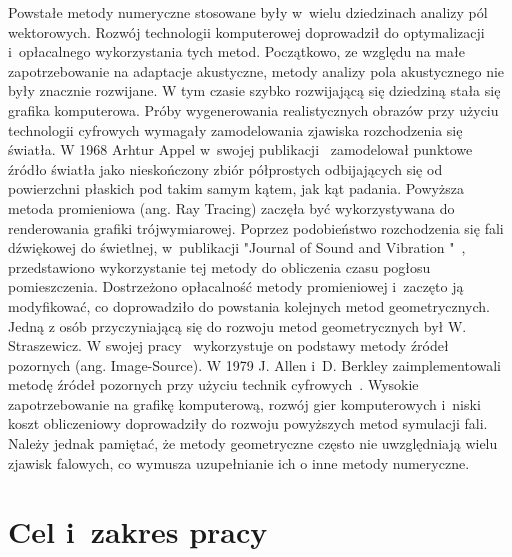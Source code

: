 Powstałe metody numeryczne stosowane były w~wielu dziedzinach analizy pól wektorowych. Rozwój technologii komputerowej doprowadził do optymalizacji i~opłacalnego wykorzystania tych metod. Początkowo, ze względu na małe zapotrzebowanie na adaptacje akustyczne, metody analizy pola akustycznego nie były znacznie rozwijane. W tym czasie szybko rozwijającą się dziedziną stała się grafika komputerowa. Próby wygenerowania realistycznych obrazów przy użyciu technologii cyfrowych wymagały zamodelowania zjawiska rozchodzenia się światła. W 1968 Arhtur Appel w~swojej publikacji~\cite{b3} zamodelował punktowe źródło światła jako nieskończony zbiór półprostych odbijających się od powierzchni płaskich pod takim samym kątem, jak kąt padania.  Powyższa  metoda promieniowa (ang. Ray Tracing) zaczęła być wykorzystywana do  renderowania grafiki trójwymiarowej. Poprzez podobieństwo rozchodzenia się fali dźwiękowej do świetlnej, w~publikacji "Journal of Sound and Vibration "~\cite{b4}, przedstawiono wykorzystanie tej metody do obliczenia czasu pogłosu pomieszczenia. Dostrzeżono opłacalność metody promieniowej i~zaczęto ją modyfikować, co doprowadziło do powstania kolejnych metod geometrycznych. Jedną z osób przyczyniającą się do rozwoju metod geometrycznych był W. Straszewicz. W swojej pracy~\cite{b5} wykorzystuje  on podstawy metody źródeł pozornych (ang. Image-Source). W 1979 J. Allen i~D. Berkley zaimplementowali  metodę źródeł pozornych przy użyciu technik cyfrowych~\cite{b6}. Wysokie zapotrzebowanie na grafikę komputerową, rozwój gier komputerowych i~niski koszt obliczeniowy doprowadziły do rozwoju powyższych metod symulacji fali. Należy jednak pamiętać, że metody geometryczne często nie uwzględniają wielu zjawisk falowych, co wymusza uzupełnianie ich o inne metody numeryczne.  



\section{Cel i~zakres pracy}\label{sec:celizakres}


